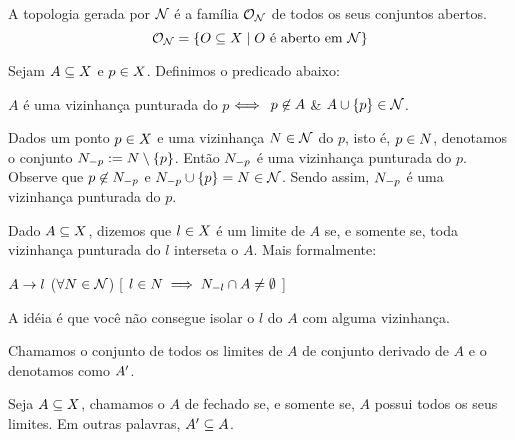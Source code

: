 \begin{definition}[Topologia]
\label{def:topologia}
	A topologia gerada por $\mathcal{N}$ é a família $\mathcal{O}_{\mathcal{N}}$ de todos os seus conjuntos abertos.
	\[
		\mathcal{O}_{\mathcal{N}} = \left\{ O \subseteq X \mid \text{$O$ é aberto em \ensuremath{\mathcal{N}}}\right\}
	\]
\end{definition}

\begin{definition}
\label{def:vizinhanca-punturada}
	Sejam $A \subseteq X$ e $p \in X$. Definimos o predicado abaixo:
	\begin{center}
		$A$ é uma vizinhança punturada do $p$ $\Longleftrightarrow\;$ $p \not\in A$ \& $A \cup \left\{p\right\} \in \mathcal{N}$.
	\end{center}
	\begin{example}
		Dados um ponto $p \in X$ e uma vizinhança $N \in \mathcal{N}$ do $p$, isto é, $p \in N$, denotamos o conjunto $N_{-p} := N \setminus \left\{p\right\}$. Então $N_{-p}$ é uma vizinhança punturada do $p$.	Observe que $p \not\in N_{-p}$ e $N_{-p} \cup \left\{p\right\} = N \in \mathcal{N}$.
		Sendo assim, $N_{-p}$ é uma vizinhança punturada do $p$.
	\end{example}
\end{definition}

\begin{definition}[Limite]
\label{def:limit-point}
	Dado $A \subseteq X$, dizemos que $l \in X$ é um limite de $A$ se, e somente se, toda vizinhança punturada do $l$ interseta o $A$. Mais formalmente:
	\begin{center}
		$A \rightarrow l$ \sse
			($\forall N \in \mathcal{N}$)%
			[ $l \in N \implies N_{-l} \cap A \neq \emptyset$ ]
	\end{center}
	A idéia é que você não consegue isolar o $l$ do $A$ com alguma vizinhança.
\end{definition}

\begin{definition}
	Chamamos o conjunto de todos os limites de $A$ de conjunto derivado de $A$ e o denotamos como $A^{\prime}$.
\end{definition}

\begin{definition}[Fechado]
	Seja $A \subseteq X$, chamamos o $A$ de fechado se, e somente se, $A$ possui todos os seus limites. Em outras palavras, $A^{\prime} \subseteq A$.
\end{definition}

